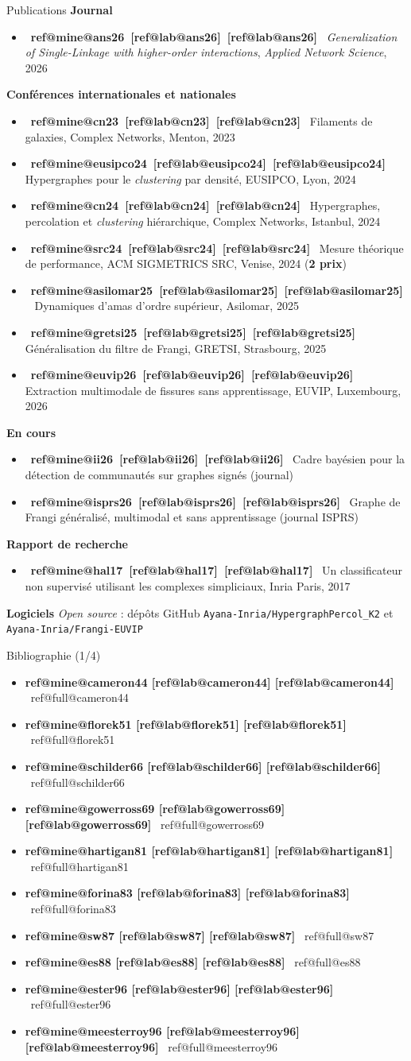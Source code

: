 \documentclass[A4,svgnames,9pt,aspectratio=169]{beamer}
\makeatletter
\newcommand{\refbracket}[1]{%
  \ifcsname ref@mine@#1\endcsname
    \textcolor{inria-rouge}{[\csname ref@lab@#1\endcsname]}%
  \else
    \textcolor{gris_fonce_inria}{[\csname ref@lab@#1\endcsname]}%
  \fi}
\newcommand{\citb}[1]{\mbox{{\footnotesize\bfseries\refbracket{#1}}}}
\newcommand{\bibligne}[1]{\item {\bfseries\refbracket{#1}}\ \csname ref@full@#1\endcsname}
\makeatother
\begin{document}
\begin{frame}{Publications}
    \footnotesize
    \textbf{Journal}
    \begin{itemize}
        \item \citb{ans26} \emph{Generalization of Single-Linkage with higher-order interactions}, \textit{Applied Network Science}, 2026
    \end{itemize}
    \textbf{Conférences internationales et nationales}
    \begin{itemize}
        \item \citb{cn23} Filaments de galaxies, Complex Networks, Menton, 2023
        \item \citb{eusipco24} Hypergraphes pour le \emph{clustering} par densité, EUSIPCO, Lyon, 2024
        \item \citb{cn24} Hypergraphes, percolation et \emph{clustering} hiérarchique, Complex Networks, Istanbul, 2024
        \item \citb{src24} Mesure théorique de performance, ACM SIGMETRICS SRC, Venise, 2024 (\textbf{2 prix})
        \item \citb{asilomar25} Dynamiques d'amas d'ordre supérieur, Asilomar, 2025
        \item \citb{gretsi25} Généralisation du filtre de Frangi, GRETSI, Strasbourg, 2025
        \item \citb{euvip26} Extraction multimodale de fissures sans apprentissage, EUVIP, Luxembourg, 2026
    \end{itemize}
    \textbf{En cours}
    \begin{itemize}
        \item \citb{ii26} Cadre bayésien pour la détection de communautés sur graphes signés (journal)
        \item \citb{isprs26} Graphe de Frangi généralisé, multimodal et sans apprentissage (journal ISPRS)
    \end{itemize}
    \textbf{Rapport de recherche}
    \begin{itemize}
        \item \citb{hal17} Un classificateur non supervisé utilisant les complexes simpliciaux, Inria Paris, 2017
    \end{itemize}
    \textbf{Logiciels} \emph{Open source} : dépôts GitHub \texttt{Ayana-Inria/HypergraphPercol\_K2}
    et \texttt{Ayana-Inria/Frangi-EUVIP}
\end{frame}

\begin{frame}{Bibliographie (1/4)}
    \scriptsize
    \begin{itemize}
        \setlength{\itemsep}{2.5pt}
                        \bibligne{cameron44}
        \bibligne{florek51}
        \bibligne{schilder66}
        \bibligne{gowerross69}
        \bibligne{hartigan81}
        \bibligne{forina83}
        \bibligne{sw87}
        \bibligne{es88}
        \bibligne{ester96}
        \bibligne{meesterroy96}
    \end{itemize}
\end{frame}
\end{document}

